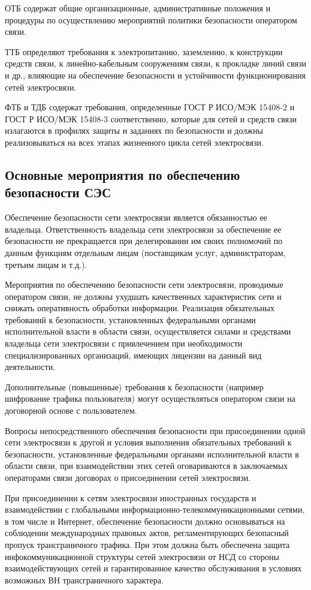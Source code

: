 \documentclass[12pt, russian, oneside, article]{ncc}
\begin{document}
ОТБ содержат общие организационные, административные положения и процедуры по осуществлению мероприятий политики безопасности оператором связи.

ТТБ определяют требования к электропитанию, заземлению, к конструкции средств связи, к линейно-кабельным сооружениям связи, к прокладке линий связи и др., влияющие на обеспечение безопасности и устойчивости функционирования сетей электросвязи.

ФТБ и ТДБ содержат требования, определенные ГОСТ Р ИСО/МЭК 15408-2 и ГОСТ Р ИСО/МЭК 15408-3 соответственно, которые для сетей и средств связи излагаются в профилях защиты и заданиях по безопасности и должны реализовываться на всех этапах жизненного цикла сетей электросвязи.
\subsection{Основные мероприятия по обеспечению безопасности СЭС}
\label{sec-1_6}


Обеспечение безопасности сети электросвязи является обязанностью ее владельца. Ответственность владельца сети электросвязи за обеспечение ее безопасности не прекращается при делегировании им своих полномочий по данным функциям отдельным лицам (поставщикам услуг, администраторам, третьим лицам и т.д.).

Мероприятия по обеспечению безопасности сети электросвязи, проводимые оператором связи, не должны ухудшать качественных характеристик сети и снижать оперативность обработки информации. Реализация обязательных требований к безопасности, установленных федеральными органами исполнительной власти в области связи, осуществляется силами и средствами владельца сети электросвязи с привлечением при необходимости специализированных организаций, имеющих лицензии на данный вид деятельности.

Дополнительные (повышенные) требования к безопасности (например шифрование трафика пользователя) могут осуществляться оператором связи на договорной основе с пользователем.

Вопросы непосредственного обеспечения безопасности при присоединении одной сети электросвязи к другой и условия выполнения обязательных требований к безопасности, установленные федеральными органами исполнительной власти в области связи, при взаимодействии этих сетей оговариваются в заключаемых операторами связи договорах о присоединении сетей электросвязи.

При присоединении к сетям электросвязи иностранных государств и взаимодействии с глобальными информационно-телекоммуникационными сетями, в том числе и Интернет, обеспечение безопасности должно основываться на соблюдении международных правовых актов, регламентирующих безопасный пропуск трансграничного трафика. При этом должна быть обеспечена защита инфокоммуникационной структуры сетей электросвязи от НСД со стороны взаимодействующих сетей и гарантированное качество обслуживания в условиях возможных ВН трансграничного характера.
\end{document}
